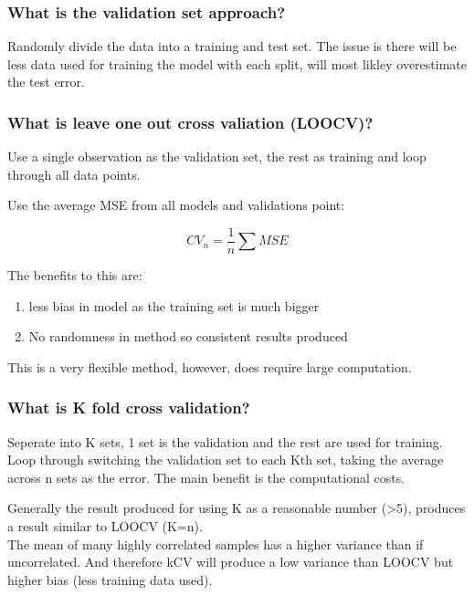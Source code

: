 \documentclass[11pt]{scrartcl} %
\begin{document}
\subsubsection{What is the validation set approach?}

Randomly divide the data into a training and test set. The issue is there will be less data used
for training the model with each split, will most likley overestimate the test error.

\subsubsection{What is leave one out cross valiation (LOOCV)?}

Use a single observation as the validation set, the rest as training and loop through all data points.

Use the average MSE from all models and validations point:

\begin{equation}
	CV_n = \frac{1}{n} \sum MSE
\end{equation}

The benefits to this are:
\begin{enumerate}
	\item less bias in model as the training set is much bigger
	\item No randomness in method so consistent results produced
\end{enumerate}

This is a very flexible method, however, does require large computation.

\subsubsection{What is K fold cross validation?}

Seperate into K sets, 1 set is the validation and the rest are used for training. Loop through switching
the validation set to each Kth set, taking the average across n sets as the error. 
The main benefit is the computational costs.

Generally the result produced for using K as a reasonable number (>5), produces a result similar to
LOOCV (K=n).\\

The mean of many highly correlated samples has a higher variance than if uncorrelated. And therefore
kCV will produce a low variance than LOOCV but higher bias (less training data used).\\
\end{document}
